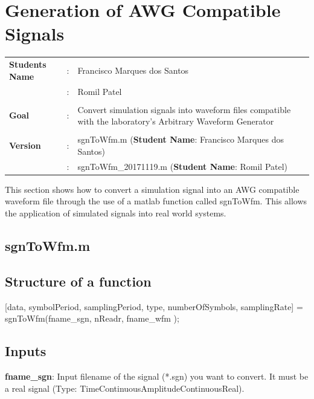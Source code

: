\clearpage

\section{Generation of AWG Compatible Signals}

\begin{tcolorbox}	
	\begin{tabular}{p{2.75cm} p{0.2cm} p{10.5cm}} 	
		\textbf{Students Name}  &:& Francisco Marques dos Santos\\
						   	    &:& Romil Patel\\\\
		\textbf{Goal}           &:& Convert simulation signals into waveform files compatible with the laboratory's Arbitrary Waveform Generator\\\\
		\textbf{Version}        &:& sgnToWfm.m (\textbf{Student Name}: Francisco Marques dos Santos)\\
							    &:& sgnToWfm\_20171119.m (\textbf{Student Name}: Romil Patel)
	\end{tabular}
\end{tcolorbox}


This section shows how to convert a simulation signal into an AWG compatible waveform file through the use of a matlab function called sgnToWfm. This allows the application of simulated signals into real world systems.

\subsection{sgnToWfm.m}

\subsection*{Structure of a function}

[data, symbolPeriod, samplingPeriod, type, numberOfSymbols, samplingRate] = sgnToWfm(fname\_sgn, nReadr, fname\_wfm );

\subsection*{Inputs}

\indent

\textbf{fname\_sgn}: Input filename of the signal (*.sgn) you want to convert. It must be a real signal (Type: TimeContinuousAmplitudeContinuousReal).
\bigskip

